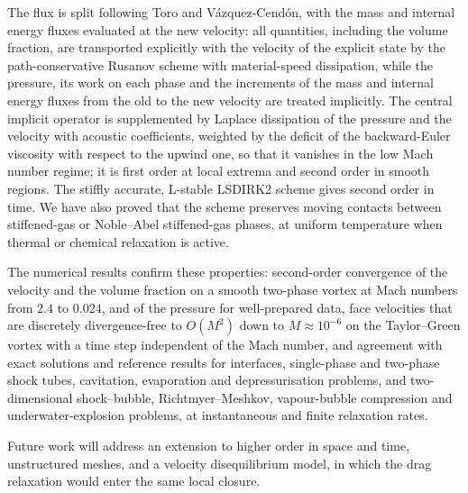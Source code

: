 The flux is split following Toro and V\'azquez-Cend\'on, with the mass and internal energy fluxes evaluated at the new
velocity: all quantities, including the volume fraction, are transported
explicitly with the velocity of the explicit state by the path-conservative Rusanov scheme with material-speed
dissipation, while the pressure, its work on each phase and the increments of the mass and internal energy fluxes from the
old to the new velocity are treated implicitly. The central implicit operator is
supplemented by Laplace dissipation of the pressure and the velocity with acoustic coefficients, weighted by the
deficit of the backward-Euler viscosity with respect to the upwind one, so that it vanishes in the low Mach number
regime; it is first order at local extrema and second order in smooth regions. The stiffly accurate, L-stable LSDIRK2
scheme gives second order in time. We have also proved that the scheme preserves moving contacts between stiffened-gas
or Noble--Abel stiffened-gas phases, at uniform temperature when thermal or chemical relaxation is active.

The numerical results confirm these properties: second-order convergence of the velocity and the volume fraction on a
smooth two-phase vortex at Mach numbers from $2.4$ to $0.024$, and of the pressure for well-prepared data, face
velocities that are discretely divergence-free to $O(M^2)$ down to $M\approx10^{-6}$ on the Taylor--Green vortex with
a time step independent of the Mach number, and agreement with exact solutions and reference results for interfaces,
single-phase and two-phase shock tubes, cavitation, evaporation and depressurisation problems, and two-dimensional
shock--bubble, Richtmyer--Meshkov, vapour-bubble compression and underwater-explosion problems, at instantaneous and
finite relaxation rates.

Future work will address an extension to higher order in space and time, unstructured meshes, and a velocity
disequilibrium model, in which the drag relaxation would enter the same local closure.
